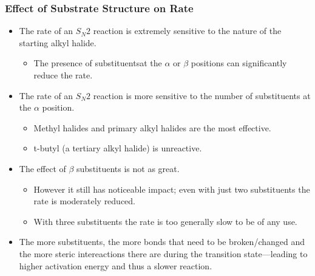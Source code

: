 \documentclass[12pt,a4paper]{article}
\begin{document}
\begin{itemize}
    \subsubsection{Effect of Substrate Structure on Rate}
    \begin{itemize}
        \item The rate of an \(S_N2\) reaction is extremely sensitive to the nature of the starting alkyl halide. 
            \begin{itemize}
                \item The presence of substituentsat the $\alpha$ or $\beta$ positions can significantly reduce the rate. 
            \end{itemize}
        \item The rate of an \(S_N2\) reaction is more sensitive to the number of substituents at the $\alpha$ position. 
            \begin{itemize}
                \item Methyl halides and primary alkyl halides are the most effective.
                \item t-butyl (a tertiary alkyl halide) is unreactive.
            \end{itemize}
        \item The effect of $\beta$ substituents is not as great.
            \begin{itemize}
                \item However it still has noticeable impact; even with just two substituents the rate is moderately reduced.
                \item With three substituents the rate is too generally slow to be of any use.
            \end{itemize}
        \item The more substituents, the more bonds that need to be broken/changed and the more steric intereactions there are during the transition state---leading to higher activation energy and thus a slower reaction.
        \end{itemize}

\end{itemize}
\end{document}
